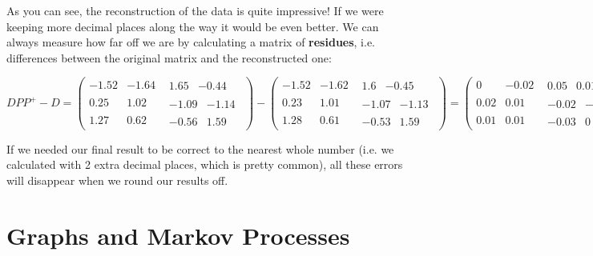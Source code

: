 \documentclass[oneside,english]{amsbook}
\numberwithin{section}{chapter}
\theoremstyle{plain}
\theoremstyle{definition}
\begin{document}
As you can see, the reconstruction of the data is quite impressive! If
we were keeping more decimal places along the way it would be even
better. We can always measure how far off we are by calculating a matrix
of \textbf{residues}, i.e. differences between the original matrix and
the reconstructed one:

\[{DPP^{+} - D = \begin{pmatrix}
		- 1.52 & - 1.64 & \begin{matrix}
			1.65 & - 0.44
		\end{matrix} \\
		0.25 & 1.02 & \begin{matrix}
			- 1.09 & - 1.14
		\end{matrix} \\
		1.27 & 0.62 & \begin{matrix}
			- 0.56 & 1.59
		\end{matrix}
	\end{pmatrix} - \begin{pmatrix}
		- 1.52 & - 1.62 & \begin{matrix}
			1.6 & - 0.45
		\end{matrix} \\
		0.23 & 1.01 & \begin{matrix}
			- 1.07 & - 1.13
		\end{matrix} \\
		1.28 & 0.61 & \begin{matrix}
			- 0.53 & 1.59
		\end{matrix}
	\end{pmatrix}
}{= \begin{pmatrix}
		0 & - 0.02 & \begin{matrix}
			0.05 & 0.01
		\end{matrix} \\
		0.02 & 0.01 & \begin{matrix}
			- 0.02 & - 0.01
		\end{matrix} \\
		0.01 & 0.01 & \begin{matrix}
			- 0.03 & 0
		\end{matrix}
\end{pmatrix}}\]

If we needed our final result to be correct to the nearest whole number
(i.e. we calculated with 2 extra decimal places, which is pretty
common), all these errors will disappear when we round our results off.

\chapter{Graphs and Markov Processes}
\end{document}
